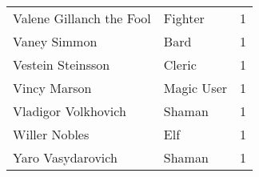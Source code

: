 \begin{tcolorbox}[breakable, title=Index by level]
\begin{supertabular}{p{0.6\columnwidth}lr}
Valene Gillanch the Fool                           & Fighter         &     1\\
Vaney Simmon                                       & Bard            &     1\\
Vestein Steinsson                                  & Cleric          &     1\\
Vincy Marson                                       & Magic User      &     1\\
Vladigor Volkhovich                                & Shaman          &     1\\
Willer Nobles                                      & Elf             &     1\\
Yaro Vasydarovich                                  & Shaman          &     1\\
\end{supertabular}
\end{tcolorbox}
\clearpage
